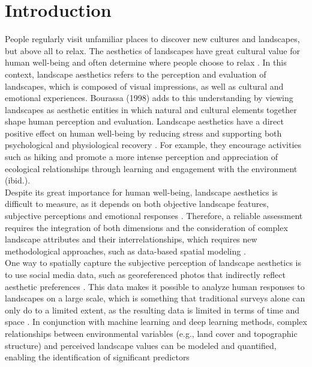 \documentclass[hidelinks, 11pt]{article}
\begin{document}


\section{Introduction}\label{sec:Einleitung}
People regularly visit unfamiliar places to discover new cultures and landscapes, but above all to relax. The aesthetics of landscapes have great cultural value for human well-being and often determine where people choose to relax \citep{havinga_social_2021, daniel_contributions_2012}. In this context, landscape aesthetics refers to the perception and evaluation of landscapes, which is composed of visual impressions, as well as cultural and emotional experiences. Bourassa (1998) adds to this understanding by viewing landscapes as aesthetic entities in which natural and cultural elements together shape human perception and evaluation. Landscape aesthetics have a direct positive effect on human well-being by reducing stress and supporting both psychological and physiological recovery \citep{gobster_shared_2007}. For example, they encourage activities such as hiking and promote a more intense perception and appreciation of ecological relationships through learning and engagement with the environment (ibid.). \\
Despite its great importance for human well-being, landscape aesthetics is difficult to measure, as it depends on both objective landscape features, subjective perceptions and emotional responses \citep{zhang_assessment_2022, tveit_key_2006, daniel_whither_2001}. Therefore, a reliable assessment requires the integration of both dimensions and the consideration of complex landscape attributes and their interrelationships, which requires new methodological approaches, such as data-based spatial modeling \citep{frank_assessment_2013,sahraoui_spatial_2016}. \\
One way to spatially capture the subjective perception of landscape aesthetics is to use social media data, such as georeferenced photos that indirectly reflect aesthetic preferences \citep{cardoso_classifying_2022,langemeyer_mapping_2018,tieskens_aesthetic_2018}. This data makes it possible to analyze human responses to landscapes on a large scale, which is something that traditional surveys alone can only do to a limited extent, as the resulting data is limited in terms of time and space \citep{cardoso_classifying_2022, yoshimura_demand_2017, bragagnolo_modelling_2016}. In conjunction with machine learning and deep learning methods, complex relationships between environmental variables (e.g., land cover and topographic structure) and perceived landscape values can be modeled and quantified, enabling the identification of significant predictors 
\end{document}
